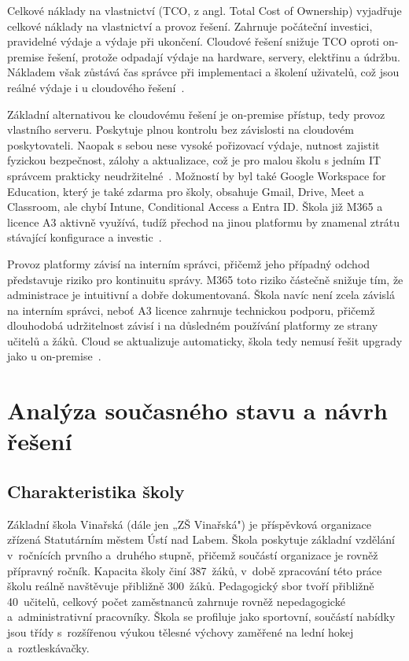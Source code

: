 \documentclass[male,czech,api_bc]{kitheses}
\begin{document}
Celkové náklady na vlastnictví (TCO, z angl. Total Cost of Ownership) vyjadřuje celkové náklady na vlastnictví a provoz řešení. Zahrnuje počáteční investici, pravidelné výdaje a výdaje při ukončení. Cloudové řešení snižuje TCO oproti on-premise řešení, protože odpadají výdaje na hardware, servery, elektřinu a údržbu. Nákladem však zůstává čas správce při implementaci a školení uživatelů, což jsou reálné výdaje i u cloudového řešení~\cite{Nayar2018}.

Základní alternativou ke cloudovému řešení je on-premise přístup, tedy provoz vlastního serveru. Poskytuje plnou kontrolu bez závislosti na cloudovém poskytovateli. Naopak s sebou nese vysoké pořizovací výdaje, nutnost zajistit fyzickou bezpečnost, zálohy a aktualizace, což je pro malou školu s jedním IT správcem prakticky neudržitelné~\cite{Nayar2018}. Možností by byl také Google Workspace for Education, který je také zdarma pro školy, obsahuje Gmail, Drive, Meet a Classroom, ale chybí Intune, Conditional Access a Entra ID. Škola již M365 a licence A3 aktivně využívá, tudíž přechod na jinou platformu by znamenal ztrátu stávající konfigurace a investic~\cite{MicrosoftM365Edu2025}.

Provoz platformy závisí na interním správci, přičemž jeho případný odchod představuje riziko pro kontinuitu správy. M365 toto riziko částečně snižuje tím, že administrace je intuitivní a dobře dokumentovaná. Škola navíc není zcela závislá na interním správci, neboť A3 licence zahrnuje technickou podporu, přičemž dlouhodobá udržitelnost závisí i na důsledném používání platformy ze strany učitelů a žáků. Cloud se aktualizuje automaticky, škola tedy nemusí řešit upgrady jako u on-premise~\cite{MicrosoftM365Edu2025, Nayar2018}.

\chapter{Analýza současného stavu a návrh řešení}

\section{Charakteristika školy}

Základní škola Vinařská (dále jen „ZŠ Vinařská") je příspěvková organizace 
zřízená Statutárním městem Ústí nad Labem. Škola poskytuje základní vzdělání v~ročnících prvního a~druhého stupně, přičemž součástí organizace je rovněž přípravný ročník. Kapacita školy činí 387~žáků, v~době zpracování této práce školu reálně navštěvuje přibližně 300~žáků. Pedagogický sbor tvoří přibližně 40~učitelů, celkový počet zaměstnanců zahrnuje rovněž nepedagogické a~administrativní pracovníky. Škola se profiluje jako sportovní, součástí nabídky jsou třídy s~rozšířenou výukou tělesné výchovy zaměřené na lední hokej a~roztleskávačky.
\end{document}

